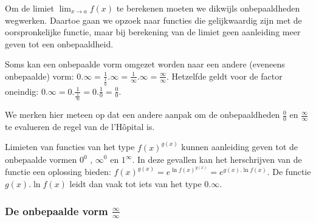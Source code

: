 Om de limiet ${\displaystyle \lim_{x\to a}}f(x)$ te berekenen moeten
we dikwijls onbepaaldheden wegwerken. Daartoe gaan we opzoek naar
functies die gelijkwaardig zijn met de oorspronkelijke functie, maar
bij berekening van de limiet geen aanleiding meer geven tot een onbepaaldheid.

\noindent Soms kan een onbepaalde vorm omgezet worden naar een andere
(eveneens onbepaalde) vorm: ${\displaystyle 0.\infty=\frac{1}{\frac{1}{0}}.\infty=\frac{1}{\infty}.\infty=\frac{\infty}{\infty}}$.
Hetzelfde geldt voor de factor oneindig: ${\displaystyle 0.\infty=0.\frac{1}{\frac{1}{\infty}}=0.\frac{1}{0}=\frac{0}{0}}$.

\noindent We merken hier meteen op dat een andere aanpak om de onbepaaldheden
$\frac{0}{0}$ en $\frac{\infty}{\infty}$ te evalueren de regel van
de l'H\^opital is.

\noindent Limieten van functies van het type $f(x)^{g(x)}$ kunnen
aanleiding geven tot de onbepaalde vormen $0{}^{0}$ , $\infty{}^{0}$
en $1{}^{\infty}$. In deze gevallen kan het herschrijven van de functie
een oplossing bieden: ${\displaystyle f(x)^{g(x)}=e^{\ln f(x)^{g(x)}}=e^{g(x).\ln f(x)}}$.
De functie $g(x).\ln f(x)$ leidt dan vaak tot iets van het type $0.\infty$.


\subsubsection{De onbepaalde vorm $\frac{\infty}{\infty}$}

